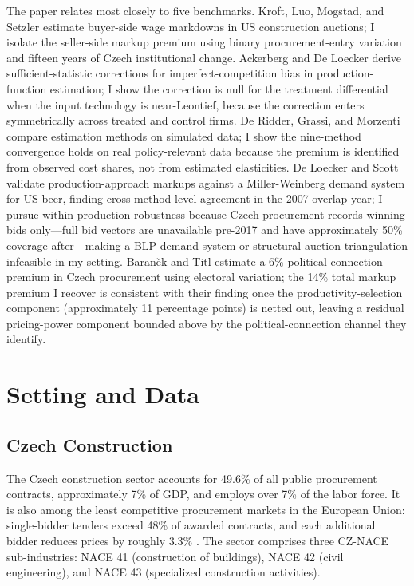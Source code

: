 \documentclass[11pt]{article}
\begin{document}
The paper relates most closely to five benchmarks. Kroft, Luo, Mogstad, and Setzler \cite{KLMS2025} estimate buyer-side wage markdowns in US construction auctions; I isolate the seller-side markup premium using binary procurement-entry variation and fifteen years of Czech institutional change. Ackerberg and De Loecker \cite{ADL2024} derive sufficient-statistic corrections for imperfect-competition bias in production-function estimation; I show the correction is null for the treatment differential when the input technology is near-Leontief, because the correction enters symmetrically across treated and control firms. De Ridder, Grassi, and Morzenti \cite{DGM2026} compare estimation methods on simulated data; I show the nine-method convergence holds on real policy-relevant data because the premium is identified from observed cost shares, not from estimated elasticities. De Loecker and Scott \cite{DeLoeckerScott2025} validate production-approach markups against a Miller-Weinberg demand system for US beer, finding cross-method level agreement in the 2007 overlap year; I pursue within-production robustness because Czech procurement records winning bids only---full bid vectors are unavailable pre-2017 and have approximately 50\% coverage after---making a BLP demand system or structural auction triangulation infeasible in my setting. Baran\v{e}k and Titl \cite{BaranekTitl2024} estimate a 6\% political-connection premium in Czech procurement using electoral variation; the 14\% total markup premium I recover is consistent with their finding once the productivity-selection component (approximately 11 percentage points) is netted out, leaving a residual pricing-power component bounded above by the political-connection channel they identify.


\section{Setting and Data}\label{sec:data}

\subsection{Czech Construction}\label{sec:setting}

The Czech construction sector accounts for 49.6\% of all public procurement contracts, approximately 7\% of GDP, and employs over 7\% of the labor force. It is also among the least competitive procurement markets in the European Union: single-bidder tenders exceed 48\% of awarded contracts, and each additional bidder reduces prices by roughly 3.3\% \cite{PalgutaPertold2017}. The sector comprises three CZ-NACE sub-industries: NACE 41 (construction of buildings), NACE 42 (civil engineering), and NACE 43 (specialized construction activities).
\end{document}
